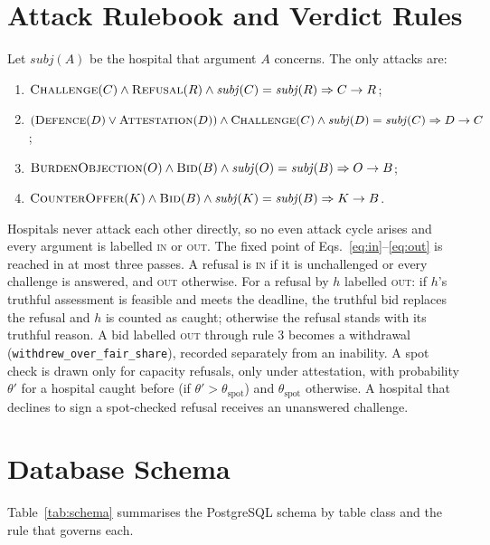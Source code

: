 \section{Attack Rulebook and Verdict Rules}
\label{app:rules}
Let $\mathit{subj}(A)$ be the hospital that argument $A$ concerns. The only attacks are:
\begin{enumerate}
\setlength{\itemsep}{1pt}
\item $\textsc{Challenge}(C)\wedge\textsc{Refusal}(R)\wedge\mathit{subj}(C)=\mathit{subj}(R)\Rightarrow C\rightarrow R$;
\item $(\textsc{Defence}(D)\vee\textsc{Attestation}(D))\wedge\textsc{Challenge}(C)\wedge\mathit{subj}(D)=\mathit{subj}(C)\Rightarrow D\rightarrow C$;
\item $\textsc{BurdenObjection}(O)\wedge\textsc{Bid}(B)\wedge\mathit{subj}(O)=\mathit{subj}(B)\Rightarrow O\rightarrow B$;
\item $\textsc{CounterOffer}(K)\wedge\textsc{Bid}(B)\wedge\mathit{subj}(K)=\mathit{subj}(B)\Rightarrow K\rightarrow B$.
\end{enumerate}
Hospitals never attack each other directly, so no even attack cycle arises and every argument is labelled \textsc{in} or \textsc{out}. The fixed point of Eqs.~\eqref{eq:in}--\eqref{eq:out} is reached in at most three passes. A refusal is \textsc{in} if it is unchallenged or every challenge is answered, and \textsc{out} otherwise. For a refusal by $h$ labelled \textsc{out}: if $h$'s truthful assessment is feasible and meets the deadline, the truthful bid replaces the refusal and $h$ is counted as caught; otherwise the refusal stands with its truthful reason. A bid labelled \textsc{out} through rule 3 becomes a withdrawal (\texttt{withdrew\_over\_fair\_share}), recorded separately from an inability. A spot check is drawn only for capacity refusals, only under attestation, with probability $\theta'$ for a hospital caught before (if $\theta'>\theta_{\text{spot}}$) and $\theta_{\text{spot}}$ otherwise. A hospital that declines to sign a spot-checked refusal receives an unanswered challenge.

\section{Database Schema}
\label{app:db}
Table~\ref{tab:schema} summarises the PostgreSQL schema by table class and the rule that governs each.

